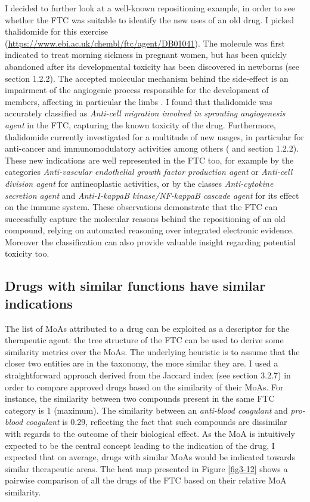 I decided to further look at a well-known repositioning example, in order to see whether the FTC was suitable to identify the new uses of an old drug. I picked thalidomide for this exercise (\url{https://www.ebi.ac.uk/chembl/ftc/agent/DB01041}). The molecule was first indicated to treat morning sickness in pregnant women, but has been quickly abandoned after its developmental toxicity has been discovered in newborns (see section 1.2.2). The accepted molecular mechanism behind the side-effect is  an impairment of the angiogenic process responsible for the development of members, affecting in particular the limbs \citep{therapontos2009thalidomide}. I found that thalidomide was accurately classified as \emph{Anti-cell migration involved in sprouting angiogenesis agent} in the FTC, capturing the known toxicity of the drug. Furthermore, thalidomide currently investigated for a multitude of new usages, in particular for anti-cancer and immunomodulatory activities among others (\cite{teo2005thalidomide} and section 1.2.2). These new indications are well represented in the FTC too, for example by the categories \emph{Anti-vascular endothelial growth factor production agent} or \emph{Anti-cell division agent} for antineoplastic activities, or by the classes \emph{Anti-cytokine secretion agent} and \emph{Anti-I-kappaB kinase/NF-kappaB cascade agent} for its effect on the immune system. These observations demonstrate that the FTC can successfully capture the molecular reasons behind the repositioning of an old compound, relying on automated reasoning over integrated electronic evidence. Moreover the classification can also provide valuable insight regarding potential toxicity too.

\subsection{Drugs with similar functions have similar indications}
The list of MoAs attributed to a drug can be exploited as a descriptor for the therapeutic agent: the tree structure of the FTC can be used to derive some similarity metrics over the MoAs. The underlying heuristic is to assume that the closer two entities are in the taxonomy, the more similar they are. I used a straightforward approach derived from the Jaccard index (see section 3.2.7) in order to compare approved drugs based on the similarity of their MoAs. For instance, the similarity between two compounds present in the same FTC category is 1 (maximum). The similarity between an \emph{anti-blood coagulant} and \emph{pro-blood coagulant} is 0.29, reflecting the fact that such compounds are dissimilar with regards to the outcome of their biological effect. As the MoA is intuitively expected to be the central concept leading to the indication of the drug, I expected that on average, drugs with similar MoAs would be indicated towards similar therapeutic areas.
The heat map presented in Figure \ref{fig3-12} shows a pairwise comparison of all the drugs of the FTC based on their relative MoA similarity.


